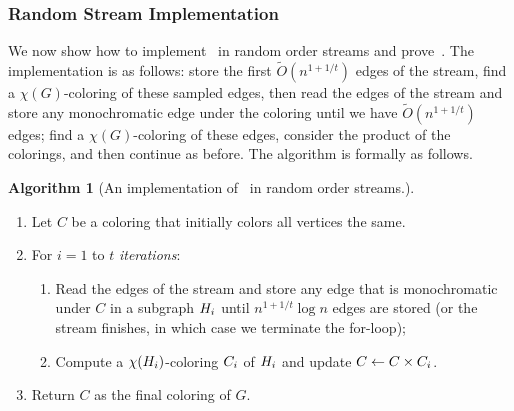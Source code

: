 \documentclass[11pt]{article}
\theoremstyle{definition}
\newenvironment{ourbox}{\begin{mdframed}[hidealllines=false,innerleftmargin=10pt,backgroundcolor=white!10,innertopmargin=5pt,innerbottommargin=5pt,roundcorner=10pt]}{\end{mdframed}}
\newtheorem{mdalgorithm}{Algorithm}
\newenvironment{Algorithm}{\begin{ourbox}\begin{mdalgorithm}}{\end{mdalgorithm}\end{ourbox}}
\newcommand{\Ot}{\ensuremath{\widetilde{O}}}
\begin{document}
\subsubsection{Random Stream Implementation}

We now show how to implement~ in random order streams and prove~. The implementation is as follows: store the first $\Ot(n^{1+1/t})$ 
edges of the stream, find a $\chi(G)$-coloring of these sampled edges, then read the edges of the stream and store any monochromatic edge under the coloring until 
we have $\Ot(n^{1+1/t})$ edges; find a $\chi(G)$-coloring of these edges, consider the product of the colorings, and then continue as before. The algorithm is formally as follows. 

\begin{Algorithm}[An implementation of~ in random order streams.]\label{alg:random-order}
~\vspace{-4pt}
	\begin{enumerate}
		\item Let $C$ be a coloring that initially colors all vertices the same. 
		\item For $i=1$ to $t$ \emph{iterations}: 
		\begin{enumerate}
			\item Read the edges of the stream and store any edge that is monochromatic under $C$ in a subgraph $H_{i}$ until $n^{1+1/t}\log{n}$ edges
			are stored (or the stream finishes, in which case we terminate the for-loop);  
			\item Compute a $\chi(H_{i})$-coloring $C_{i}$ of $H_{i}$ and update $C \leftarrow C \times C_{i}$.  
		\end{enumerate}
		\item Return $C$ as the final coloring of $G$. 
	\end{enumerate}
\end{Algorithm}
\end{document}

